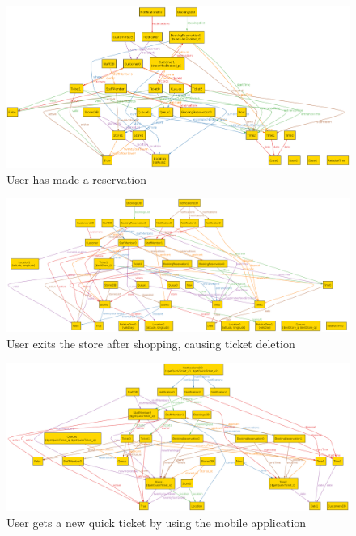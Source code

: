 \begin{figure} [H]
	\includegraphics[width=\linewidth]{../Alloy/userHasBooked.png}
	\caption{User has made a reservation}
	\label{fig:userHasBooked}
\end{figure}

\begin{figure} [H]
	\includegraphics[width=\linewidth]{../Alloy/exitStore.png}
	\caption{User exits the store after shopping, causing ticket deletion}
	\label{fig:alloyExitStore}
\end{figure}

\begin{figure} [H]
	\includegraphics[width=\linewidth]{../Alloy/getQuickTicket.png}
	\caption{User gets a new quick ticket by using the mobile application}
	\label{fig:exitStore}
\end{figure}

